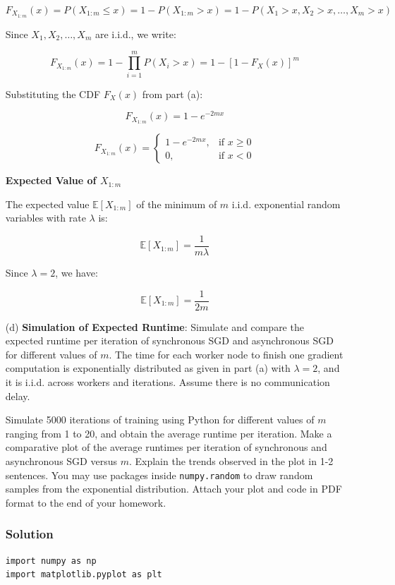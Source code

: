\documentclass{article}
\begin{document}
\begin{enumerate}
    \[
    F_{X_{1:m}}(x) = P(X_{1:m} \leq x) = 1 - P(X_{1:m} > x) = 1 - P(X_1 > x, X_2 > x, \dots, X_m > x)
    \]

    Since $X_1, X_2, \dots, X_m$ are i.i.d., we write:

    \[
    F_{X_{1:m}}(x) = 1 - \prod_{i=1}^m P(X_i > x) = 1 - \left[1 - F_X(x)\right]^m
    \]

    Substituting the CDF $F_X(x)$ from part (a):

    \[F_{X_{1:m}}(x) = 1 - e^{-2mx} \]

    \[
    F_{X_{1:m}}(x) =
    \begin{cases}
    1 - e^{-2mx}, & \text{if } x \geq 0 \\
    0, & \text{if } x < 0
    \end{cases}
    \]

    \textbf{Expected Value of $X_{1:m}$}

    The expected value $\mathbb{E}[X_{1:m}]$ of the minimum of $m$ i.i.d. exponential random variables with rate $\lambda$ is:

    \[
    \mathbb{E}[X_{1:m}] = \frac{1}{m \lambda}
    \]

    Since $\lambda = 2$, we have:

    \[
    \mathbb{E}[X_{1:m}] = \frac{1}{2m}
    \]


    \item[(d)] \textbf{Simulation of Expected Runtime}:
    Simulate and compare the expected runtime per iteration of synchronous SGD and asynchronous SGD for different values of $m$. The time for each worker node to finish one gradient computation is exponentially distributed as given in part (a) with $\lambda = 2$, and it is i.i.d. across workers and iterations. Assume there is no communication delay.

    Simulate 5000 iterations of training using Python for different values of $m$ ranging from 1 to 20, and obtain the average runtime per iteration. Make a comparative plot of the average runtimes per iteration of synchronous and asynchronous SGD versus $m$. Explain the trends observed in the plot in 1-2 sentences. You may use packages inside \texttt{numpy.random} to draw random samples from the exponential distribution. Attach your plot and code in PDF format to the end of your homework.

    \subsubsection*{Solution}
    \begin{verbatim}
import numpy as np
import matplotlib.pyplot as plt


\end{verbatim}
\end{enumerate}
\end{document}
